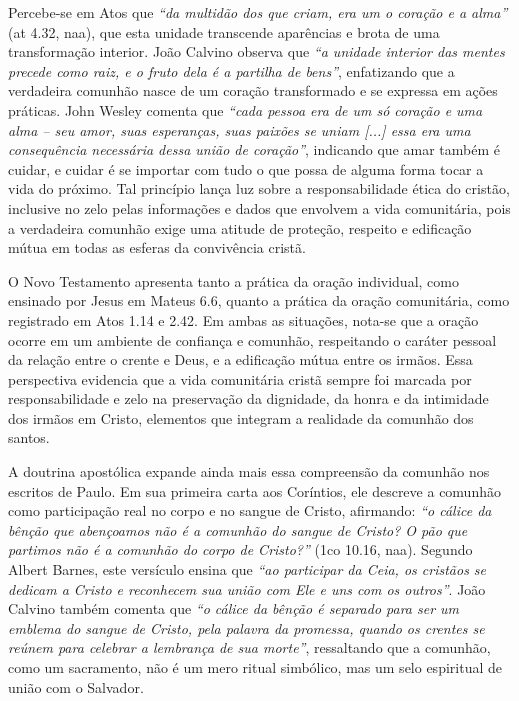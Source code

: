 Percebe-se em Atos que \textit{``da multidão dos que criam, era um o coração e a alma''} (\gls{at} 4.32, \gls{naa}), que esta unidade transcende aparências e brota de uma transformação interior. João Calvino observa que \textit{``a unidade interior das mentes precede como raiz, e o fruto dela é a partilha de bens''}\cite{calvinoAtos4}, enfatizando que a verdadeira comunhão nasce de um coração transformado e se expressa em ações práticas. John Wesley comenta que \textit{``cada pessoa era de um só coração e uma alma – seu amor, suas esperanças, suas paixões se uniam [...] essa era uma consequência necessária dessa união de coração''}\cite{wesleyAtos4}, indicando que amar também é cuidar, e cuidar é se importar com tudo o que possa de alguma forma tocar a vida do próximo. Tal princípio lança luz sobre a responsabilidade ética do cristão, inclusive no zelo pelas informações e dados que envolvem a vida comunitária, pois a verdadeira comunhão exige uma atitude de proteção, respeito e edificação mútua em todas as esferas da convivência cristã.

O Novo Testamento apresenta tanto a prática da oração individual, como ensinado por Jesus em Mateus 6.6, quanto a prática da oração comunitária, como registrado em Atos 1.14 e 2.42. Em ambas as situações, nota-se que a oração ocorre em um ambiente de confiança e comunhão, respeitando o caráter pessoal da relação entre o crente e Deus, e a edificação mútua entre os irmãos. Essa perspectiva evidencia que a vida comunitária cristã sempre foi marcada por responsabilidade e zelo na preservação da dignidade, da honra e da intimidade dos irmãos em Cristo, elementos que integram a realidade da comunhão dos santos.

A doutrina apostólica expande ainda mais essa compreensão da comunhão nos escritos de Paulo. Em sua primeira carta aos Coríntios, ele descreve a comunhão como participação real no corpo e no sangue de Cristo, afirmando: \textit{``o cálice da bênção que abençoamos não é a comunhão do sangue de Cristo? O pão que partimos não é a comunhão do corpo de Cristo?''} (\gls{1co} 10.16, \gls{naa}). Segundo Albert Barnes, este versículo ensina que \textit{``ao participar da Ceia, os cristãos se dedicam a Cristo e reconhecem sua união com Ele e uns com os outros''}\cite{barnes1co10}. João Calvino também comenta que \textit{``o cálice da bênção é separado para ser um emblema do sangue de Cristo, pela palavra da promessa, quando os crentes se reúnem para celebrar a lembrança de sua morte''}\cite{calvino1co10}, ressaltando que a comunhão, como um sacramento, não é um mero ritual simbólico, mas um selo espiritual de união com o Salvador.

